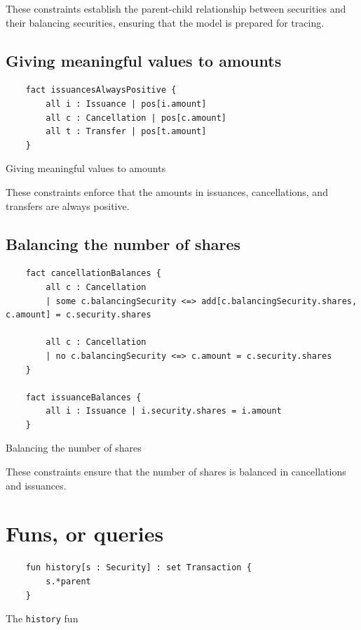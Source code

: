 These constraints establish the parent-child relationship between securities and their balancing securities, ensuring that the model is prepared for tracing.

\subsection{Giving meaningful values to amounts}
\begin{listing}[!h]
\begin{verbatim}
	fact issuancesAlwaysPositive {
		all i : Issuance | pos[i.amount]
		all c : Cancellation | pos[c.amount]
		all t : Transfer | pos[t.amount]
	}
\end{verbatim}
\caption{Giving meaningful values to amounts}
\label{lst:amounts-constraint-1}
\end{listing}

These constraints enforce that the amounts in issuances, cancellations, and transfers are always positive.

\subsection{Balancing the number of shares}
\begin{listing}[!h]
\begin{verbatim}
	fact cancellationBalances {
		all c : Cancellation
		| some c.balancingSecurity <=> add[c.balancingSecurity.shares, c.amount] = c.security.shares
		
		all c : Cancellation
		| no c.balancingSecurity <=> c.amount = c.security.shares
	}
	
	fact issuanceBalances {
		all i : Issuance | i.security.shares = i.amount
	}
\end{verbatim}
\caption{Balancing the number of shares}
\label{lst:balances-constraint-1}
\end{listing}

These constraints ensure that the number of shares is balanced in cancellations and issuances.

\section{Funs, or queries}
\begin{listing}[!h]
\begin{verbatim}
	fun history[s : Security] : set Transaction {
		s.*parent
	}
\end{verbatim}
\caption{The \texttt{history} fun}
\label{lst:history-fun-1}
\end{listing}

